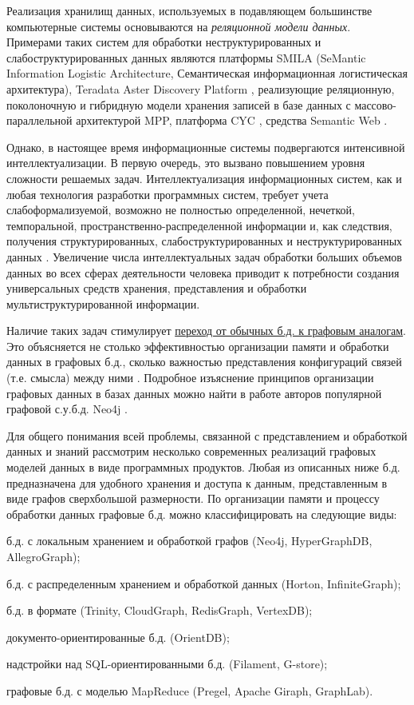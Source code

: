 Реализация хранилищ данных, используемых в подавляющем большинстве компьютерные системы основываются на \textit{реляционной модели данных}. Примерами таких систем для обработки неструктурированных и слабоструктурированных данных являются платформы SMILA (SeMantic Information Logistic Architecture, Семантическая информационная логистическая архитектура), Teradata Aster Discovery Platform \cite{ballinger2009teradata}, реализующие реляционную, поколоночную и гибридную модели хранения записей в базе данных с массово-параллельной архитектурой MPP, платформа CYC \cite{CycPlatform2022}, средства Semantic Web \cite{sem_web}.

Однако, в настоящее время информационные системы подвергаются интенсивной интеллектуализации. В первую очередь, это вызвано повышением уровня сложности решаемых задач. Интеллектуализация информационных систем, как и любая технология разработки программных систем, требует учета слабоформализуемой, возможно не полностью определенной, нечеткой, темпоральной, пространственно-распределенной информации и, как следствия, получения структурированных, слабоструктурированных и неструктурированных данных \cite{Rudikova2018}. Увеличение числа интеллектуальных задач обработки больших объемов данных во всех сферах деятельности человека приводит к потребности создания универсальных средств хранения, представления и обработки мультиструктурированной информации.

Наличие таких задач стимулирует \underline{переход от обычных б.д. к графовым аналогам}. Это объясняется не столько эффективностью организации памяти и обработки данных в графовых б.д., сколько важностью представления конфигураций связей (т.е. смысла) между ними . Подробное изъяснение принципов организации графовых данных в базах данных можно найти в работе авторов популярной графовой с.у.б.д. Neo4j \cite{GDB}.

Для общего понимания всей проблемы, связанной с представлением и обработкой данных и знаний рассмотрим несколько современных реализаций графовых моделей данных в виде программных продуктов. Любая из описанных ниже б.д. предназначена для удобного хранения и доступа к данным, представленным в виде графов сверхбольшой размерности. По организации памяти и процессу обработки данных графовые б.д. можно классифицировать на следующие виды:
\begin{textitemize}
    \item б.д. с локальным хранением и обработкой графов (Neo4j, HyperGraphDB, AllegroGraph);
    \item б.д. с распределенным хранением и обработкой данных (Horton, InfiniteGraph);
    \item б.д. в формате  (Trinity, CloudGraph, RedisGraph, VertexDB);
    \item документо-ориентированные б.д. (OrientDB);
    \item надстройки над SQL-ориентированными б.д. (Filament, G-store);
    \item графовые б.д. с моделью MapReduce (Pregel, Apache Giraph, GraphLab).
\end{textitemize}

